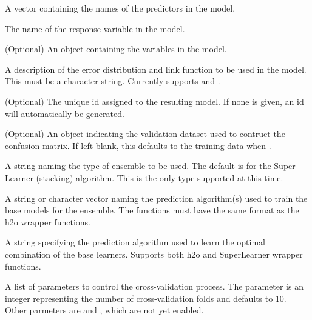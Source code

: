 \documentclass[a4paper]{book}
\begin{document}
\begin{Arguments}
\begin{ldescription}
\item[\code{x}] 
A vector containing the names of the predictors in the model.

\item[\code{y}] 
The name of the response variable in the model.

\item[\code{training\_frame}] 
(Optional) An  object containing the variables in the model.

\item[\code{family}] 
A description of the error distribution and link function to be used in the model.  This must be a character string.  Currently supports  and .  

\item[\code{model\_id}] 
(Optional) The unique id assigned to the resulting model. If none is given, an id will automatically be generated.

\item[\code{validation\_frame}] 
(Optional) An  object indicating the validation dataset used to contruct the confusion matrix. If left blank, this defaults to the training data when .

\item[\code{type}] 
A string naming the type of ensemble to be used.  The default is  for the Super Learner (stacking) algorithm.  This is the only type supported at this time.

\item[\code{learner}] 
A string or character vector naming the prediction algorithm(s) used to train the base models for the ensemble.  The functions must have the same format as the h2o wrapper functions.

\item[\code{metalearner}] 
A string specifying the prediction algorithm used to learn the optimal combination of the base learners.  Supports both h2o and SuperLearner wrapper functions.

\item[\code{cvControl}] 
A list of parameters to control the cross-validation process. The  parameter is an integer representing the number of cross-validation folds and defaults to 10. Other parmeters are  and , which are not yet enabled. 


\end{ldescription}
\end{Arguments}
\end{document}

